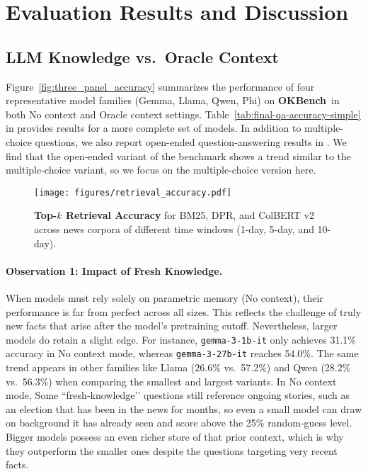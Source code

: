 \documentclass[11pt]{article}
\newcommand{\name}{{\textbf{OKBench}}}
\begin{document}
\section{Evaluation Results and Discussion}
\label{sec:experiments}

\subsection{LLM Knowledge vs.\ Oracle Context}
Figure~\ref{fig:three_panel_accuracy} summarizes the performance of four representative model families (Gemma, Llama, Qwen, Phi) on \name~in both No context and Oracle context settings. 
Table~\ref{tab:final-qa-accuracy-simple} in  provides results for a more complete set of models. In addition to multiple-choice questions, we also report open-ended question-answering results in . We find that the open‑ended variant of the benchmark shows a trend similar to the multiple‑choice variant, so we focus on the multiple‑choice version here.

\begin{figure*}[ht]
    \centering
    \texttt{[image: figures/retrieval\_accuracy.pdf]}
    \caption{\textbf{Top-$k$ Retrieval Accuracy} for BM25, DPR, and ColBERT v2 across news corpora of different time windows (1-day, 5-day, and 10-day).}
    \label{fig:retrieval_bar}
\end{figure*}


\paragraph{Observation 1: Impact of Fresh Knowledge.} When models must rely solely on parametric memory (No context), their performance is far from perfect across all sizes. This reflects the challenge of truly new facts that arise after the model’s pretraining cutoff. Nevertheless, larger models do retain a slight edge. For instance, \texttt{gemma-3-1b-it} only achieves 31.1\% accuracy in No context mode, whereas \texttt{gemma-3-27b-it} reaches 54.0\%. The same trend appears in other families like Llama (26.6\% vs.\ 57.2\%) and Qwen (28.2\% vs.\ 56.3\%) when comparing the smallest and largest variants. 
In No context mode, Some “fresh‑knowledge’’ questions still reference ongoing stories, such as an election that has been in the news for months, so even a small model can draw on background it has already seen and score above the 25\% random‑guess level. Bigger models possess an even richer store of that prior context, which is why they outperform the smaller ones despite the questions targeting very recent facts.
\end{document}

